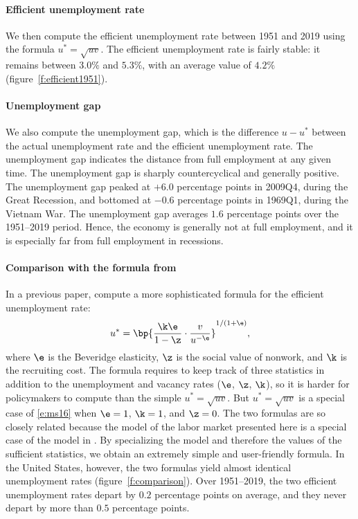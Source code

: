 \documentclass[letterpaper,12pt,leqno]{article}
\begin{document}
\paragraph{Efficient unemployment rate} We then compute the efficient unemployment rate between 1951 and 2019 using the formula $u^* = \sqrt{uv}$. The efficient unemployment rate is fairly stable: it remains between $3.0\%$ and $5.3\%$, with an average value of $4.2\%$ (figure~\ref{f:efficient1951}). 

\paragraph{Unemployment gap} We also compute the unemployment gap, which is the difference $u-u^*$ between the actual unemployment rate and the efficient unemployment rate. The unemployment gap indicates the distance from full employment at any given time. The unemployment gap is sharply countercyclical and generally positive. The unemployment gap peaked at $+6.0$ percentage points in 2009Q4, during the Great Recession, and bottomed at $-0.6$ percentage points in 1969Q1, during the Vietnam War. The unemployment gap averages $1.6$ percentage points over the 1951--2019 period. Hence, the economy is generally not at full employment, and it is especially far from full employment in recessions.

\paragraph{Comparison with the formula from \citet{MS16}} In a previous paper, \citet[proposition 3]{MS16} compute a more sophisticated formula for the efficient unemployment rate:
\begin{equation}
u^* = \bp{\frac{\k \e}{1-\z}\cdot\frac{v}{u^{-\e}}}^{1/(1+\e)},
\label{e:ms16}\end{equation}
where  $\e$ is the Beveridge elasticity, $\z$ is the social value of nonwork, and $\k$ is the recruiting cost. The formula requires to keep track of three statistics in addition to the unemployment and vacancy rates ($\e$, $\z$, $\k$), so it is harder for policymakers to compute than the simple $u^* = \sqrt{uv}$. But $u^* = \sqrt{uv}$ is a special case of \eqref{e:ms16} when $\e=1$, $\k=1$, and $\z=0$. The two formulas are so closely related because the model of the labor market presented here is a special case of the model in \citet{MS16}. By specializing the model and therefore the values of the sufficient statistics, we obtain an extremely simple and user-friendly formula. In the United States, however, the two formulas yield almost identical unemployment rates (figure~\ref{f:comparison}). Over 1951--2019, the two efficient unemployment rates depart by $0.2$ percentage points on average, and they never depart by more than $0.5$ percentage points.
\end{document}
